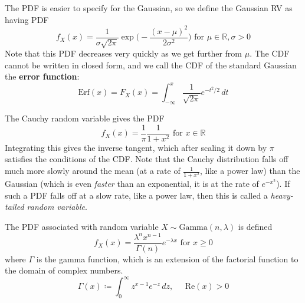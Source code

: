 \documentclass{article}
\begin{document}
      \begin{example}
        The PDF is easier to specify for the Gaussian, so we define the Gaussian RV as having PDF 
        \begin{equation}
          f_X (x) = \frac{1}{\sigma \sqrt{2 \pi}} \exp \bigg( -\frac{(x - \mu)^2}{2 \sigma^2} \bigg) \text{ for } \mu \in \mathbb{R}, \sigma > 0
        \end{equation}
        Note that this PDF decreases very quickly as we get further from $\mu$. The CDF cannot be written in closed form, and we call the CDF of the standard Gaussian the \textbf{error function}: 
        \begin{equation}
          \mathrm{Erf}(x) = F_X (x) = \int_{-\infty}^x \frac{1}{\sqrt{2 \pi}} e^{- t^2 / 2} \, dt
        \end{equation}
      \end{example}

      \begin{example}
        The Cauchy random variable gives the PDF 
        \begin{equation}
          f_X (x) = \frac{1}{\pi} \frac{1}{1 + x^2} \text{ for } x \in \mathbb{R}
        \end{equation}
        Integrating this gives the inverse tangent, which after scaling it down by $\pi$ satisfies the conditions of the CDF. Note that the Cauchy distribution falls off much more slowly around the mean (at a rate of $\frac{1}{1 + x^2}$, like a power law) than the Gaussian (which is even \textit{faster} than an exponential, it is at the rate of $e^{-x^2}$). If such a PDF falls off at a slow rate, like a power law, then this is called a \textit{heavy-tailed random variable}. 
      \end{example}

      \begin{example}
        The PDF associated with random variable $X \sim \mathrm{Gamma}(n, \lambda)$ is defined 
        \begin{equation}
          f_X(x) = \frac{\lambda^n x^{n-1}}{\Gamma(n)} e^{-\lambda x} \text{ for } x \geq 0
        \end{equation}
        where $\Gamma$ is the gamma function, which is an extension of the factorial function to the domain of complex numbers. 
        \begin{equation}
          \Gamma(x) \coloneqq \int_{0}^\infty z^{x-1} e^{-z}\, dz, \;\;\;\;\; \text{Re}(x) > 0
        \end{equation}
      \end{example}
\end{document}
